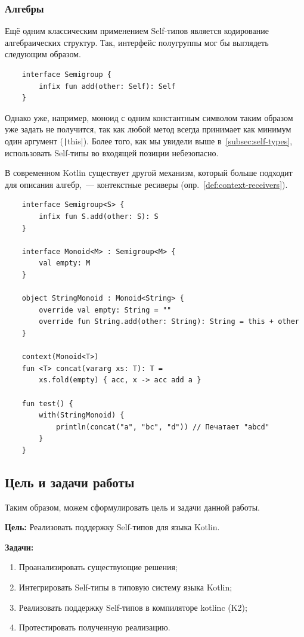 \subsubsection{Алгебры} \label{subsubsec:algebras}

Ещё одним классическим применением Self-типов является кодирование алгебраических структур.
Так, интерфейс полугруппы мог бы выглядеть следующим образом.

\begin{verbatim}
    interface Semigroup {
        infix fun add(other: Self): Self
    }
\end{verbatim}

Однако уже, например, моноид с одним константным символом таким образом уже задать не получится, так как любой метод всегда принимает как минимум один аргумент (\texttt|this|).
Более того, как мы увидели выше в~\ref{subsec:self-types}, использовать Self-типы во входящей позиции небезопасно.

В современном Kotlin существует другой механизм, который больше подходит для описания алгебр,~--- контекстные ресиверы (опр.~\ref{def:context-receivers}).

\begin{verbatim}
    interface Semigroup<S> {
        infix fun S.add(other: S): S
    }

    interface Monoid<M> : Semigroup<M> {
        val empty: M
    }

    object StringMonoid : Monoid<String> {
        override val empty: String = ""
        override fun String.add(other: String): String = this + other
    }

    context(Monoid<T>)
    fun <T> concat(vararg xs: T): T =
        xs.fold(empty) { acc, x -> acc add a }

    fun test() {
        with(StringMonoid) {
            println(concat("a", "bc", "d")) // Печатает "abcd"
        }
    }
\end{verbatim}


\subsection{Цель и задачи работы}

Таким образом, можем сформулировать цель и задачи данной работы.

\textbf{Цель: } Реализовать поддержку Self-типов для языка Kotlin.

\textbf{Задачи:}
\begin{enumerate}
    \item Проанализировать существующие решения;
    \item Интегрировать Self-типы в типовую систему языка Kotlin;
    \item Реализовать поддержку Self-типов в компиляторе kotlinc (K2);
    \item Протестировать полученную реализацию.
\end{enumerate}
